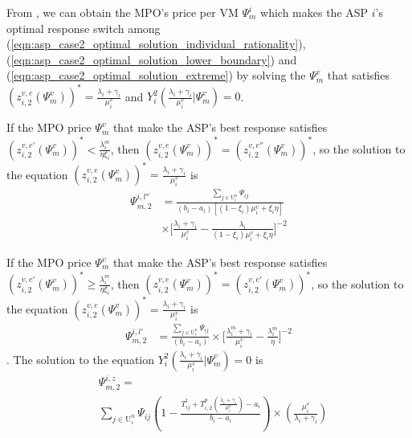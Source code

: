 \documentclass[conference]{IEEEtran}
\begin{document}
From , we can obtain the MPO's price per VM $\Psi_m^i$ which makes the ASP $i$'s optimal response switch among (\ref{eqn:asp_case2_optimal_solution_individual_rationality}), (\ref{eqn:asp_case2_optimal_solution_lower_boundary}) and (\ref{eqn:asp_case2_optimal_solution_extreme}) by solving the $\Psi_m^v$ that satisfies $(z_{i,2}^{v,e}(\Psi_m^v))^* = \frac{\lambda_i+\gamma_i}{\mu_i^v}$ and  $Y_i^2(\frac{\lambda_i+\gamma_i}{\mu_i^v}|\Psi_m^v) = 0$.

If the MPO price $\Psi_m^v$ that make the ASP's best response satisfies $(z_{i,2}^{v,e'}(\Psi_m^v))^* < \frac{\lambda_i^m}{\eta\xi_i}$, then $(z_{i,2}^{v,e}(\Psi_m^v))^* = (z_{i,2}^{v,e''}(\Psi_m^v))^*$, so the solution to the equation $(z_{i,2}^{v,e}(\Psi_m^v))^* = \frac{\lambda_i+\gamma_i}{\mu_i^v}$ is
\begin{equation}
\begin{aligned}
\Psi_{m,2}^{i,l''}&= \frac{\sum_{j \in \mathrm{U}_i^n}\Psi_{ij}}{(b_i-a_i)[(1-\xi_i)\mu_i^v + \xi_i \eta]} \\
& \times \big[\frac{\lambda_i+\gamma_i}{\mu_i^v} - \frac{\lambda_i}{(1-\xi_i)\mu_i^v + \xi_i\eta}\big]^{-2}
\end{aligned}
\end{equation}

If the MPO price $\Psi_m^v$ that make the ASP's best response satisfies $(z_{i,2}^{v,e'}(\Psi_m^v))^* \geq \frac{\lambda_i^m}{\eta\xi_i}$, then $(z_{i,2}^{v,e}(\Psi_m^v))^* = (z_{i,2}^{v,e'}(\Psi_m^v))^*$, so the solution to the equation $(z_{i,2}^{v,e}(\Psi_m^v))^* = \frac{\lambda_i+\gamma_i}{\mu_i^v}$ is
\begin{equation}
\begin{aligned}
\Psi_{m,2}^{i,l'}&= \frac{\sum_{j \in \mathrm{U}_i^n}\Psi_{ij}}{(b_i-a_i)}  \times \big[\frac{\lambda_i^m+\gamma_i}{\mu_i^v}-\frac{\lambda_i^m}{\eta}\big]^{-2}
\end{aligned}
\end{equation}.
The solution to the equation $Y_i^2(\frac{\lambda_i+\gamma_i}{\mu_i^v}|\Psi_m^v) = 0$ is
\begin{equation}
\begin{aligned}
&\Psi_{m,2}^{i,z}= \\
&\sum_{j \in \mathrm{U}_i^{n}}\Psi_{ij}(1-\frac{T_{ij}^t + T_{i,2}^p(\frac{\lambda_i+\gamma_i}{\mu_i^v})-a_i}{b_i-a_i})\times(\frac{\mu_i^v}{\lambda_i+\gamma_i})
\end{aligned}
\end{equation}
\end{document}
